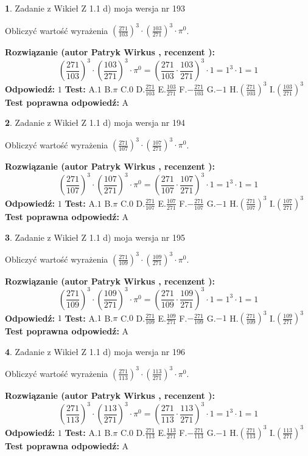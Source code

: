 \documentclass[12pt, a4paper]{article}
\theoremstyle{definition} %
\newtheorem{zad}{}
\newcommand{\zadStart}[1]{\begin{zad}#1\newline}
\newcommand{\zadStop}{\end{zad}}
\newcommand{\rozwStart}[2]{\noindent \textbf{Rozwiązanie (autor #1 , recenzent #2): }\newline}
\newcommand{\rozwStop}{\newline}
\newcommand{\odpStart}{\noindent \textbf{Odpowiedź:}\newline}
\newcommand{\odpStop}{\newline}
\newcommand{\testStart}{\noindent \textbf{Test:}\newline}
\newcommand{\testStop}{\newline}
\newcommand{\kluczStart}{\noindent \textbf{Test poprawna odpowiedź:}\newline}
\newcommand{\kluczStop}{\newline}
\begin{document}
\zadStart{Zadanie z Wikieł Z 1.1 d) moja wersja nr 193}

Obliczyć wartość wyrażenia $(\frac{271}{103})^{3} \cdot (\frac{103}{271})^{3} \cdot \pi^{0}$.
\zadStop
\rozwStart{Patryk Wirkus}{}
$$(\frac{271}{103})^{3} \cdot (\frac{103}{271})^{3} \cdot \pi^{0} = (\frac{271}{103} \cdot \frac{103}{271})^{3} \cdot 1 = 1^{3} \cdot 1 = 1$$
\rozwStop
\odpStart
$1$
\odpStop
\testStart
A.$1$ B.$\pi$ C.$0$ D.$\frac{271}{103}$ E.$\frac{103}{271}$
F.$-\frac{271}{103}$ G.$-1$
H.$(\frac{271}{103})^{3}$
I.$(\frac{103}{271})^{3}$
\testStop
\kluczStart
A
\kluczStop



\zadStart{Zadanie z Wikieł Z 1.1 d) moja wersja nr 194}

Obliczyć wartość wyrażenia $(\frac{271}{107})^{3} \cdot (\frac{107}{271})^{3} \cdot \pi^{0}$.
\zadStop
\rozwStart{Patryk Wirkus}{}
$$(\frac{271}{107})^{3} \cdot (\frac{107}{271})^{3} \cdot \pi^{0} = (\frac{271}{107} \cdot \frac{107}{271})^{3} \cdot 1 = 1^{3} \cdot 1 = 1$$
\rozwStop
\odpStart
$1$
\odpStop
\testStart
A.$1$ B.$\pi$ C.$0$ D.$\frac{271}{107}$ E.$\frac{107}{271}$
F.$-\frac{271}{107}$ G.$-1$
H.$(\frac{271}{107})^{3}$
I.$(\frac{107}{271})^{3}$
\testStop
\kluczStart
A
\kluczStop



\zadStart{Zadanie z Wikieł Z 1.1 d) moja wersja nr 195}

Obliczyć wartość wyrażenia $(\frac{271}{109})^{3} \cdot (\frac{109}{271})^{3} \cdot \pi^{0}$.
\zadStop
\rozwStart{Patryk Wirkus}{}
$$(\frac{271}{109})^{3} \cdot (\frac{109}{271})^{3} \cdot \pi^{0} = (\frac{271}{109} \cdot \frac{109}{271})^{3} \cdot 1 = 1^{3} \cdot 1 = 1$$
\rozwStop
\odpStart
$1$
\odpStop
\testStart
A.$1$ B.$\pi$ C.$0$ D.$\frac{271}{109}$ E.$\frac{109}{271}$
F.$-\frac{271}{109}$ G.$-1$
H.$(\frac{271}{109})^{3}$
I.$(\frac{109}{271})^{3}$
\testStop
\kluczStart
A
\kluczStop



\zadStart{Zadanie z Wikieł Z 1.1 d) moja wersja nr 196}

Obliczyć wartość wyrażenia $(\frac{271}{113})^{3} \cdot (\frac{113}{271})^{3} \cdot \pi^{0}$.
\zadStop
\rozwStart{Patryk Wirkus}{}
$$(\frac{271}{113})^{3} \cdot (\frac{113}{271})^{3} \cdot \pi^{0} = (\frac{271}{113} \cdot \frac{113}{271})^{3} \cdot 1 = 1^{3} \cdot 1 = 1$$
\rozwStop
\odpStart
$1$
\odpStop
\testStart
A.$1$ B.$\pi$ C.$0$ D.$\frac{271}{113}$ E.$\frac{113}{271}$
F.$-\frac{271}{113}$ G.$-1$
H.$(\frac{271}{113})^{3}$
I.$(\frac{113}{271})^{3}$
\testStop
\kluczStart
A
\kluczStop
\end{document}
